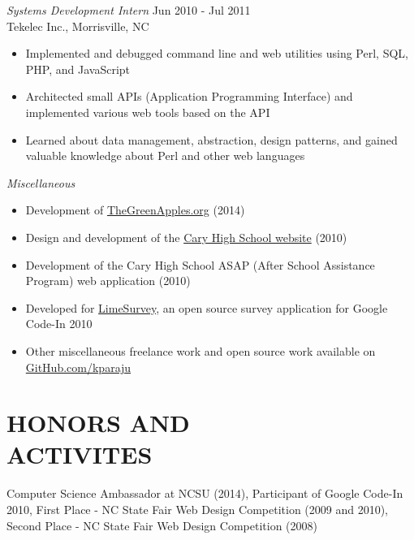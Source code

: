 \documentclass[margin]{res}
\begin{document}
\begin{resume}
                {\sl Systems Development Intern} \hfill Jun 2010 - Jul 2011 \\
                Tekelec Inc., Morrisville, NC
                \begin{itemize}  \itemsep -2pt %
                \item 
                  Implemented and debugged command line and web utilities using Perl, SQL, PHP, and JavaScript
                \item
                  Architected small APIs (Application Programming Interface) and implemented various web tools based on the API
                \item
                  Learned about data management, abstraction, design patterns, and gained valuable 
                  knowledge about Perl and other web languages
                \end{itemize}

                {\sl Miscellaneous }
                \begin{itemize}  \itemsep -2pt %
                \item
                  Development of \href{http://thegreenapples.org}{TheGreenApples.org} (2014)
                \item 
                  Design and development of the \href{http://caryhs.wcpss.net/}{Cary High School website} (2010)
                \item
                  Development of the Cary High School ASAP (After School Assistance Program) web application (2010)
                \item
                  Developed for \href{http://www.limesurvey.org/}{LimeSurvey}, an open source survey application for Google Code-In 2010
                \item
                  Other miscellaneous freelance work and open source work available on \\
                  \href{https://github.com/kparaju}{GitHub.com/kparaju} 
                \end{itemize}


\section{HONORS AND \\ ACTIVITES}
            Computer Science Ambassador at NCSU (2014),
            Participant of Google Code-In 2010, 
            First Place - NC State Fair Web Design Competition (2009 and 2010),
            Second Place - NC State Fair Web Design Competition (2008)
 
\end{resume}
\end{document}
